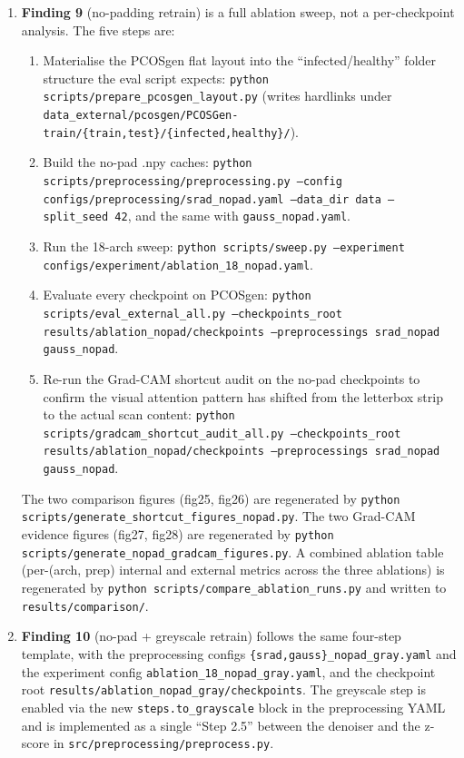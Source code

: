 \documentclass[11pt]{article}
\begin{document}
\begin{enumerate}
  \item \textbf{Finding 9} (no-padding retrain) is a full ablation
        sweep, not a per-checkpoint analysis. The five steps are:
        \begin{enumerate}
          \item Materialise the PCOSgen flat layout into the
                ``infected/healthy'' folder structure the eval script
                expects:
                \texttt{python scripts/prepare\_pcosgen\_layout.py}
                (writes hardlinks under
                \texttt{data\_external/pcosgen/PCOSGen-train/\{train,test\}/\{infected,healthy\}/}).
          \item Build the no-pad .npy caches:
                \texttt{python scripts/preprocessing/preprocessing.py --config
                configs/preprocessing/srad\_nopad.yaml --data\_dir data
                --split\_seed 42}, and the same with
                \texttt{gauss\_nopad.yaml}.
          \item Run the 18-arch sweep:
                \texttt{python scripts/sweep.py --experiment
                configs/experiment/ablation\_18\_nopad.yaml}.
          \item Evaluate every checkpoint on PCOSgen:
                \texttt{python scripts/eval\_external\_all.py
                --checkpoints\_root results/ablation\_nopad/checkpoints
                --preprocessings srad\_nopad gauss\_nopad}.
          \item Re-run the Grad-CAM shortcut audit on the no-pad
                checkpoints to confirm the visual attention pattern
                has shifted from the letterbox strip to the actual
                scan content:
                \texttt{python scripts/gradcam\_shortcut\_audit\_all.py
                --checkpoints\_root results/ablation\_nopad/checkpoints
                --preprocessings srad\_nopad gauss\_nopad}.
        \end{enumerate}
        The two comparison figures (fig25, fig26) are regenerated by
        \texttt{python scripts/generate\_shortcut\_figures\_nopad.py}.
        The two Grad-CAM evidence figures (fig27, fig28) are regenerated
        by \texttt{python scripts/generate\_nopad\_gradcam\_figures.py}.
        A combined ablation table (per-(arch, prep) internal and
        external metrics across the three ablations) is regenerated
        by \texttt{python scripts/compare\_ablation\_runs.py} and
        written to \texttt{results/comparison/}.

  \item \textbf{Finding 10} (no-pad + greyscale retrain) follows the
        same four-step template, with the preprocessing configs
        \texttt{\{srad,gauss\}\_nopad\_gray.yaml} and the experiment
        config \texttt{ablation\_18\_nopad\_gray.yaml}, and the
        checkpoint root \texttt{results/ablation\_nopad\_gray/checkpoints}.
        The greyscale step is enabled via the new
        \texttt{steps.to\_grayscale} block in the preprocessing YAML
        and is implemented as a single ``Step 2.5'' between the
        denoiser and the z-score in
        \texttt{src/preprocessing/preprocess.py}.
\end{enumerate}
\end{document}
